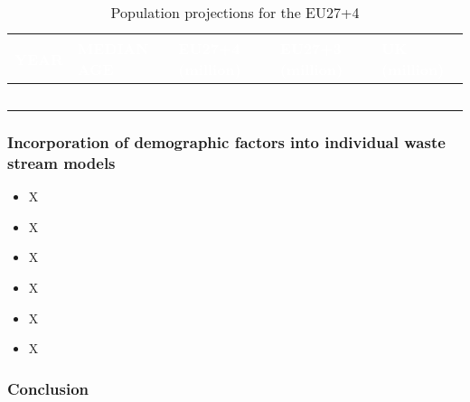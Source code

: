 \begin{table}[h!]
      \centering
      \small
      \caption{Population projections for the EU27+4}\label{tab:population}
      \begin{tabular}{|C{1.5cm}|C{1.5cm}|C{1.5cm}|C{1.5cm}|C{1.5cm}|}
            \hline
            \textcolor{white}{\textbf{YEAR}} & \textcolor{white}{\textbf{MEDIAN AGE}} & \textcolor{white}{\textbf{EU27+4} (million)} & \textcolor{white}{\textbf{EU27+3} (million)} & \textcolor{white}{\textbf{UK} (million)} \\
            \hline
      \end{tabular}

\end{table}



\clearpage
\subsubsection{Incorporation of demographic factors into individual waste stream models}




\wasteSubsubsubsecBATT
\begin{itemize}
    \item X
\end{itemize}

\wasteSubsubsubsecCDW
\begin{itemize}
    \item X
\end{itemize}

\wasteSubsubsubsecELV
\begin{itemize}
    \item X
\end{itemize}

\wasteSubsubsubsecMIN
\begin{itemize}
    \item X
\end{itemize}

\wasteSubsubsubsecSLASH
\begin{itemize}
    \item X
\end{itemize}

\wasteSubsubsubsecWEEE
\begin{itemize}
    \item X
\end{itemize}


\subsubsection{Conclusion}




\sectionEndlines
\clearpage

